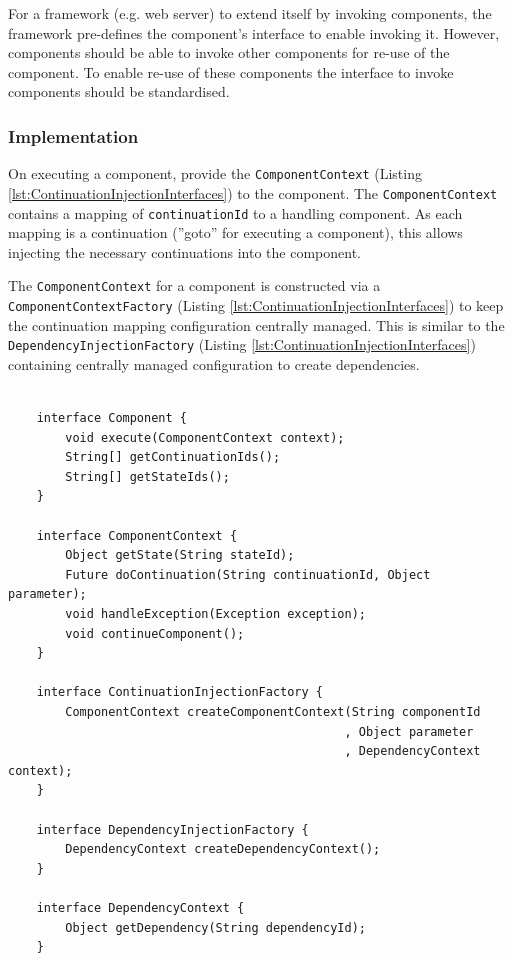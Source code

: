 \documentclass[prodmode]{style/acmlarge}
\begin{document}
For a framework (e.g. web server) to extend itself by invoking components, the
framework pre-defines the component's interface to enable invoking it.  However,
components should be able to invoke other components for re-use of the
component.  To enable re-use of these components the interface to invoke
components should be standardised.


\subsubsection*{Implementation}

On executing a component, provide the \texttt{ComponentContext} (Listing
\ref{lst:ContinuationInjectionInterfaces}) to the component.  The
\texttt{ComponentContext} contains a mapping of \texttt{continuationId} to a
handling component.  As each mapping is a continuation (''goto'' for executing a
component), this allows injecting the necessary continuations into the
component.

The \texttt{ComponentContext} for a component is constructed via a
\texttt{ComponentContextFactory} (Listing \ref{lst:ContinuationInjectionInterfaces})
to keep the continuation mapping configuration centrally managed.  This is
similar to the \texttt{DependencyInjectionFactory} (Listing
\ref{lst:ContinuationInjectionInterfaces}) containing centrally managed
configuration to create dependencies.

\begin{lstlisting}[float,label=lst:ContinuationInjectionInterfaces]

    interface Component {
        void execute(ComponentContext context);
        String[] getContinuationIds();
        String[] getStateIds();
    }

    interface ComponentContext {
        Object getState(String stateId);
        Future doContinuation(String continuationId, Object parameter);
        void handleException(Exception exception);
        void continueComponent();
    }
    
    interface ContinuationInjectionFactory {
        ComponentContext createComponentContext(String componentId
                                               , Object parameter
                                               , DependencyContext context);
    }
    
    interface DependencyInjectionFactory {
        DependencyContext createDependencyContext();
    }
    
    interface DependencyContext {
        Object getDependency(String dependencyId);
    }
\end{lstlisting}
\end{document}
